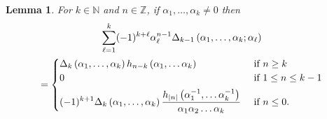 \documentclass[12pt,a4paper,reqno]{amsart}
\newtheorem{lemma}{Lemma}
\theoremstyle{remark}
\numberwithin{equation}{section}
\begin{document}
\begin{lemma}\label{lem:vandermonde}
For $k\in \mathbb{N}$ and $n\in \mathbb{Z}$, if $\alpha_1,\dots,\alpha_k \neq 0$ then
\begin{multline*}
\sum_{\ell=1}^k (-1)^{k+\ell}   \alpha_\ell^{n-1}  \Delta_{k-1}\left(\alpha_1,\dots,\alpha_k ; \alpha_\ell\right)\\
=
\begin{cases}
\displaystyle \Delta_{k}\left(\alpha_1,\dots,\alpha_{k}\right) h_{n-k}\left(\alpha_1, \dots \alpha_k\right) & \text{ if } n \geq k \\
0 & \text{ if } 1\leq n \leq k-1 \\
\noalign{\vskip1ex}
\displaystyle (-1)^{k+1} \Delta_{k}\left(\alpha_1,\dots,\alpha_{k}\right)   \frac{ h_{|n|}\left(\alpha_1^{-1}, \dots \alpha_k^{-1}\right)}{\alpha_1 \alpha_2 \dots \alpha_k} & \text{ if } n \leq 0.
\end{cases}
\end{multline*}
\end{lemma}
\end{document}
